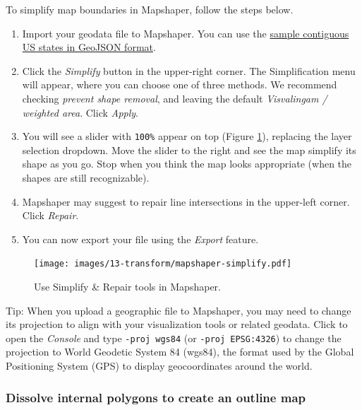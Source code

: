 \documentclass[
  english,
]{book}
\begin{document}
To simplify map boundaries in Mapshaper, follow the steps below.

\begin{enumerate}
\def\labelenumi{\arabic{enumi}.}
\item
  Import your geodata file to Mapshaper. You can use the \href{data/lower-48.geojson}{sample contiguous US states in GeoJSON format}.
\item
  Click the \emph{Simplify} button in the upper-right corner. The Simplification menu will appear,
  where you can choose one of three methods. We recommend checking \emph{prevent shape removal}, and leaving
  the default \emph{Visvalingam / weighted area}. Click \emph{Apply}.
\item
  You will see a slider with \texttt{100\%} appear on top (Figure \ref{fig:mapshaper-simplify}), replacing the layer selection dropdown.
  Move the slider to the right and see the map simplify its shape as you go. Stop when you think
  the map looks appropriate (when the shapes are still recognizable).
\item
  Mapshaper may suggest to repair line intersections in the upper-left corner. Click \emph{Repair}.
\item
  You can now export your file using the \emph{Export} feature.
\end{enumerate}



\begin{figure}
\centering
\texttt{[image: images/13-transform/mapshaper-simplify.pdf]}
\caption{\label{fig:mapshaper-simplify}Use Simplify \& Repair tools in Mapshaper.}
\end{figure}

Tip: When you upload a geographic file to Mapshaper, you may need to change its projection to align with your visualization tools or related geodata. Click to open the \emph{Console} and type \texttt{-proj\ wgs84} (or \texttt{-proj\ EPSG:4326}) to change the projection to World Geodetic System 84 (wgs84), the format used by the Global Positioning System (GPS) to display geocoordinates around the world.

\hypertarget{dissolve-internal-polygons-to-create-an-outline-map}{%
\subsubsection*{Dissolve internal polygons to create an outline map}\label{dissolve-internal-polygons-to-create-an-outline-map}}
\end{document}
